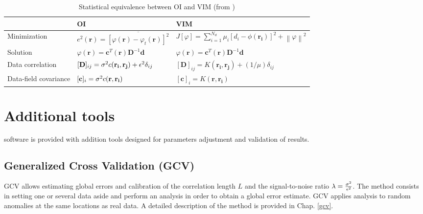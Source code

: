 \begin{table}[H]
\begin{flushleft}
\caption{Statistical equivalence between OI and VIM (from \cite{RIXEN00})\label{tabOAVIM}}
\begin{tabular}{lll}
\hline
											&		OI																																										  	&VIM \\
											\hline
Minimization \rule{0pt}{3ex}& $e^{2}(\mathbf{r})= \overline{ [\varphi(\mathbf{r})-\varphi_{t}(\mathbf{r})]^{2}}$					& $J[\varphi]=\sum_{i=1}^{N_d}\mu_{i}[d_{i}-\phi(\mathbf{r_{i}})]^{2}+\left\|\varphi\right\|^{2}$\\
Solution							& $\varphi(\mathbf{r})= \mathbf{c}^{T}(\mathbf{r})\mathbf{D}^{-1}\mathbf{d}$								& $\varphi(\mathbf{r})= \mathbf{c}^{T}(\mathbf{r})\mathbf{D}^{-1}\mathbf{d}$	\\
Data correlation			& $[\mathbf{D}]_{ij}=\sigma^{2} c(\mathbf{r_{i}},\mathbf{r_{j}})+\epsilon^{2}\delta_{ij}$	& $[\mathbf{D}]_{ij}=K(\mathbf{r_i},\mathbf{r_j})+(1/\mu)\delta_{ij}$\\
Data-field covariance & $[\mathbf{c}]_{i}=\sigma^{2} c(\mathbf{r},\mathbf{r_{i}})$																						& $[\mathbf{c}]_{i}=K(\mathbf{r},\mathbf{r_{i}})$	\\
\hline
\end{tabular}
\end{flushleft}
\end{table}


 
 
 
 
 
 
 

\section{Additional tools}

\diva software is provided with addition tools designed for parameters adjustment and validation of results.


\subsection{Generalized Cross Validation (GCV)\label{firsttool}}

GCV allows estimating global errors and calibration of the correlation length $L$ and the signal-to-noise ratio $\lambda=\frac{\sigma^{2}}{\epsilon^{2}}$.
The method consists in setting one or several data aside and perform an analysis in order to obtain a global error estimate. GCV applies analysis to random anomalies at the same locations as real data. A detailed description of the method is provided in Chap. \ref{gcv}.

